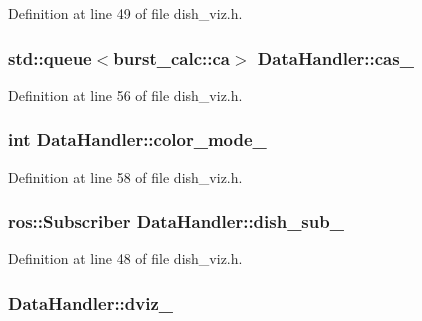 \-Definition at line 49 of file dish\-\_\-viz.\-h.

\subsubsection[{cas\-\_\-}]{\setlength{\rightskip}{0pt plus 5cm}std\-::queue$<$burst\-\_\-calc\-::ca$>$ {\bf \-Data\-Handler\-::cas\-\_\-}\hspace{0.3cm}{\ttfamily  [private]}}\label{classDataHandler_aa492ecade33dce7c1d15f38784c3a5c7}


\-Definition at line 56 of file dish\-\_\-viz.\-h.

\subsubsection[{color\-\_\-mode\-\_\-}]{\setlength{\rightskip}{0pt plus 5cm}int {\bf \-Data\-Handler\-::color\-\_\-mode\-\_\-}\hspace{0.3cm}{\ttfamily  [private]}}\label{classDataHandler_a58143515ea32c18033a5eb99092b1e87}


\-Definition at line 58 of file dish\-\_\-viz.\-h.

\subsubsection[{dish\-\_\-sub\-\_\-}]{\setlength{\rightskip}{0pt plus 5cm}ros\-::\-Subscriber {\bf \-Data\-Handler\-::dish\-\_\-sub\-\_\-}\hspace{0.3cm}{\ttfamily  [private]}}\label{classDataHandler_a1614f9646f2e37e964b2ae130dcdaf66}


\-Definition at line 48 of file dish\-\_\-viz.\-h.

\subsubsection[{dviz\-\_\-}]{ {\bf \-Data\-Handler\-::dviz\-\_\-}\hspace{0.3cm}{\ttfamily  [private]}}\label{classDataHandler_ad0f8439ce69d5d57bf43db32becffb7c}


